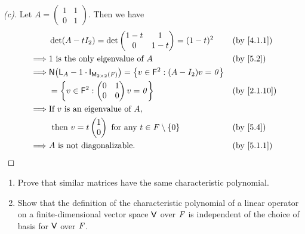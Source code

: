 \begin{proof}[(c)]
  Let \(A = \begin{pmatrix}
    1 & 1 \\
    0 & 1
  \end{pmatrix}\).
  Then we have
  \begin{align*}
             & \det(A - t I_2) = \det\begin{pmatrix}
                                       1 - t & 1     \\
                                       0     & 1 - t
                                     \end{pmatrix} = (1 - t)^2                                             &  & \text{(by \cref{4.1.1})}         \\
    \implies & 1 \text{ is the only eigenvalue of } A                                            &  & \text{(by \cref{5.2})}                     \\
    \implies & \ns{\L_A - 1 \cdot \IT[\ms{2}{2}{\F}]} = \set{v \in \vs{F}^2 : (A - I_2) v = \zv}                                                 \\
             & = \set{v \in \vs{F}^2 : \begin{pmatrix}
                                           0 & 1 \\
                                           0 & 0
                                         \end{pmatrix} v = \zv}                                           &  & \text{(by \cref{2.1.10})}           \\
    \implies & \text{If } v \text{ is an eigenvalue of } A,                                                                                      \\
             & \text{ then } v = t \begin{pmatrix}
                                     1 \\
                                     0
                                   \end{pmatrix} \text{ for any } t \in \F \setminus \set{0}                         &  & \text{(by \cref{5.4})} \\
    \implies & A \text{ is not diagonalizable}.                                                  &  & \text{(by \cref{5.1.1})}
  \end{align*}
\end{proof}

\begin{ex}\label{ex:5.1.12}
  \begin{enumerate}
    \item Prove that similar matrices have the same characteristic polynomial.
    \item Show that the definition of the characteristic polynomial of a linear operator on a finite-dimensional vector space \(\mathsf{V}\) over \(\mathit{F}\) is independent of the choice of basis for \(\mathsf{V}\) over \(\mathit{F}\).
  \end{enumerate}
\end{ex}

